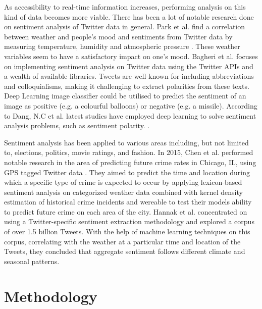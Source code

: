 \documentclass[a4paper,10pt]{article}
\begin{document}
    As accessibility to real-time information increases, performing analysis on this kind of data becomes more viable. There has been a lot of notable research done on sentiment analysis of Twitter data in general. Park et al. find a correlation between weather and people’s mood and sentiments from Twitter data by measuring temperature, humidity and atmospheric pressure . These weather variables seem to have a satisfactory impact on one’s mood. Bagheri et al.  focuses on implementing sentiment analysis on Twitter data using the Twitter APIs and a wealth of available libraries. Tweets are well-known for including abbreviations and colloquialisms, making it challenging to extract polarities from these texts. Deep Learning image classifier could be utilised to predict the sentiment of an image as positive (e.g. a colourful balloons) or negative (e.g. a missile). According to Dang, N.C et al. latest studies have employed deep learning to solve sentiment analysis problems, such as sentiment polarity. .
    
    Sentiment analysis has been applied to various areas including, but not limited to, elections, politics, movie ratings, and fashion. In 2015, Chen et al. performed notable research in the area of predicting future crime rates in Chicago, IL, using GPS tagged Twitter data . They aimed to predict the time and location during which a specific type of crime is expected to occur by applying lexicon-based sentiment analysis on categorized weather data combined with kernel density estimation of historical crime incidents and wereable to test their models ability to predict future crime on each area of the city. Hannak et al.  concentrated on using a Twitter-specific sentiment extraction methodology and explored a corpus of over 1.5 billion Tweets. With the help of machine learning techniques on this corpus, correlating with the weather at a particular time and location of the Tweets, they concluded that aggregate sentiment follows different climate and seasonal patterns.

    \section{Methodology}
    \label{methodology}
\end{document}
